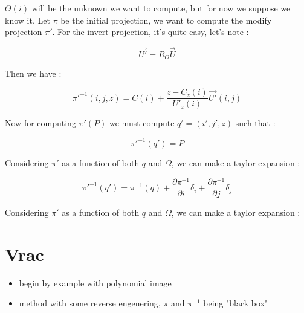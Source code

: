 $\Theta(i)$ will be the unknown we want to compute, but for now
we suppose we know it. 
Let $\pi$ be the initial projection, we want to compute the modify
projection $\pi'$.
For the invert projection, it's quite easy, let's note  :

\begin{equation}
    \vec{U'} =  R_\Theta \vec{U}
\end{equation}

Then we have :

\begin{equation}
	\pi'^{-1}(i,j,z) = C(i) + \frac{z-C_z(i)}{U'_z(i)} \vec{U'}(i,j)
\end{equation}


Now for computing $\pi'(P)$ we must compute $q'=(i',j',z)$ such that :

\begin{equation}
        \pi'^{-1}(q') = P
\end{equation}

Considering $\pi'$ as a function of both $q$ and $\Omega$,  we can make a taylor expansion :


\begin{equation}
        \pi'^{-1}(q')
      =      \pi^{-1}(q) 
      +  \frac{\partial \pi^{-1}}{\partial i }  \delta_i
      +  \frac{\partial \pi^{-1}}{\partial j }  \delta_j
\end{equation}

Considering $\pi'$ as a function of both $q$ and $\Omega$,  we can make a taylor expansion :



\section{Vrac}

\begin{itemize}
    \item begin by example with polynomial image
    \item method with some reverse engenering,  $\pi$ and $\pi^{-1}$ being "black box"
\end{itemize}


